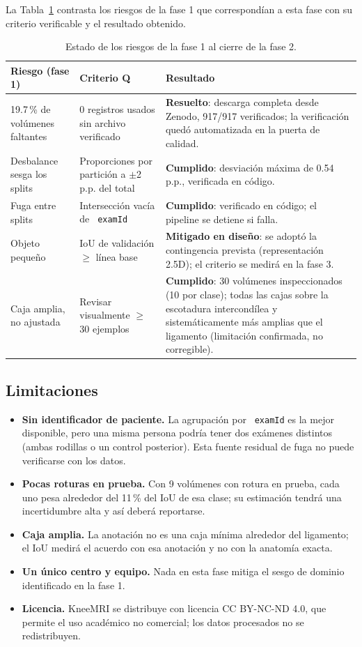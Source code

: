 \documentclass[12pt,letterpaper]{article}
\newcommand{\code}[1]{\texttt{\hyphenchar\font=-1 #1}}
\begin{document}
La Tabla~\ref{tab:riesgos} contrasta los riesgos de la fase 1 que correspondían a esta fase con su criterio verificable y el resultado obtenido.

\begin{table}[!htbp]
\centering
\small
\caption{Estado de los riesgos de la fase 1 al cierre de la fase 2.}
\label{tab:riesgos}
\begin{tabular}{p{3.4cm}p{4.6cm}p{6.2cm}}
\toprule
Riesgo (fase 1) & Criterio Q & Resultado \\
\midrule
19.7\,\% de volúmenes faltantes & 0 registros usados sin archivo verificado & \textbf{Resuelto}: descarga completa desde Zenodo, 917/917 verificados; la verificación quedó automatizada en la puerta de calidad. \\
Desbalance sesga los splits & Proporciones por partición a $\pm$2 p.p. del total & \textbf{Cumplido}: desviación máxima de 0.54 p.p., verificada en código. \\
Fuga entre splits & Intersección vacía de \code{examId} & \textbf{Cumplido}: verificado en código; el pipeline se detiene si falla. \\
Objeto pequeño & IoU de validación $\geq$ línea base & \textbf{Mitigado en diseño}: se adoptó la contingencia prevista (representación 2.5D); el criterio se medirá en la fase 3. \\
Caja amplia, no ajustada & Revisar visualmente $\geq$30 ejemplos & \textbf{Cumplido}: 30 volúmenes inspeccionados (10 por clase); todas las cajas sobre la escotadura intercondílea y sistemáticamente más amplias que el ligamento (limitación confirmada, no corregible). \\
\bottomrule
\end{tabular}
\end{table}

\subsection{Limitaciones}

\begin{itemize}[leftmargin=*]
  \item \textbf{Sin identificador de paciente.} La agrupación por \code{examId} es la mejor disponible, pero una misma persona podría tener dos exámenes distintos (ambas rodillas o un control posterior). Esta fuente residual de fuga no puede verificarse con los datos.
  \item \textbf{Pocas roturas en prueba.} Con 9 volúmenes con rotura en prueba, cada uno pesa alrededor del 11\,\% del IoU de esa clase; su estimación tendrá una incertidumbre alta y así deberá reportarse.
  \item \textbf{Caja amplia.} La anotación no es una caja mínima alrededor del ligamento; el IoU medirá el acuerdo con esa anotación y no con la anatomía exacta.
  \item \textbf{Un único centro y equipo.} Nada en esta fase mitiga el sesgo de dominio identificado en la fase 1.
  \item \textbf{Licencia.} KneeMRI se distribuye con licencia CC BY-NC-ND 4.0, que permite el uso académico no comercial; los datos procesados no se redistribuyen.
\end{itemize}
\end{document}
